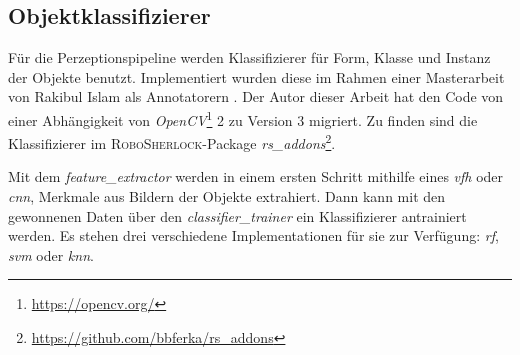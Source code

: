 \subsection{Objektklassifizierer}
\label{sec:classifiers}
Für die Perzeptionspipeline werden Klassifizierer für Form, Klasse und Instanz der Objekte benutzt. Implementiert wurden diese im Rahmen einer Masterarbeit von Rakibul Islam als \robosherlock Annotatorern \cite{rakib}. Der Autor dieser Arbeit hat den Code von einer Abhängigkeit von \textit{OpenCV}\footnote{\url{https://opencv.org/}} 2 zu Version 3 migriert. Zu finden sind die Klassifizierer im \textsc{RoboSherlock}-Package \textit{rs\_addons}\footnote{\url{https://github.com/bbferka/rs\_addons}}. \par
Mit dem \textit{feature\_extractor} werden in einem ersten Schritt mithilfe eines \textit{\gls{vfh}} oder \textit{\gls{cnn}}, Merkmale aus Bildern der Objekte extrahiert. Dann kann mit den gewonnenen Daten über den \textit{classifier\_trainer} ein Klassifizierer antrainiert werden. Es stehen drei verschiedene Implementationen für sie zur Verfügung: \textit{\gls{rf}}, \textit{\gls{svm}} oder \textit{\gls{knn}}.

